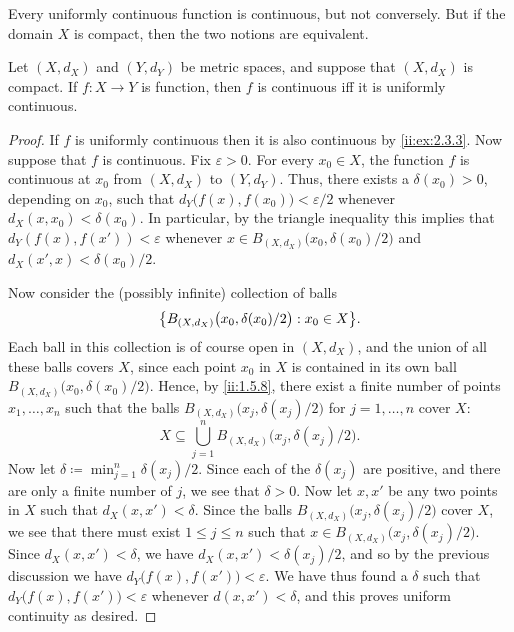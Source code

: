 \begin{note}
  Every uniformly continuous function is continuous, but not conversely.
  But if the domain \(X\) is compact, then the two notions are equivalent.
\end{note}

\begin{thm}\label{ii:2.3.5}
  Let \((X, d_X)\) and \((Y, d_Y)\) be metric spaces, and suppose that \((X, d_X)\) is compact.
  If \(f : X \to Y\) is function, then \(f\) is continuous iff it is uniformly continuous.
\end{thm}

\begin{proof}
  If \(f\) is uniformly continuous then it is also continuous by \cref{ii:ex:2.3.3}.
  Now suppose that \(f\) is continuous.
  Fix \(\varepsilon > 0\).
  For every \(x_0 \in X\), the function \(f\) is continuous at \(x_0\) from \((X, d_X)\) to \((Y, d_Y)\).
  Thus, there exists a \(\delta(x_0) > 0\), depending on \(x_0\), such that \(d_Y\big(f(x), f(x_0)\big) < \varepsilon / 2\) whenever \(d_X(x, x_0) < \delta(x_0)\).
  In particular, by the triangle inequality this implies that \(d_Y(f(x), f(x')) < \varepsilon\) whenever \(x \in B_{(X, d_X)}\big(x_0, \delta(x_0) / 2\big)\) and \(d_X(x', x) < \delta(x_0) / 2\).

  Now consider the (possibly infinite) collection of balls
  \[
    \set{B_{(X, d_X)}\big(x_0, \delta(x_0) / 2\big) : x_0 \in X}.
  \]
  Each ball in this collection is of course open in \((X, d_X)\), and the union of all these balls covers \(X\), since each point \(x_0\) in \(X\) is contained in its own ball \(B_{(X, d_X)}\big(x_0, \delta(x_0) / 2\big)\).
  Hence, by \cref{ii:1.5.8}, there exist a finite number of points \(x_1, \dots, x_n\) such that the balls \(B_{(X, d_X)}\big(x_j, \delta(x_j) / 2\big)\) for \(j = 1, \dots, n\) cover \(X\):
  \[
    X \subseteq \bigcup_{j = 1}^n B_{(X, d_X)}\big(x_j, \delta(x_j) / 2\big).
  \]
  Now let \(\delta \coloneqq \min_{j = 1}^n \delta(x_j) / 2\).
  Since each of the \(\delta(x_j)\) are positive, and there are only a finite number of \(j\), we see that \(\delta > 0\).
  Now let \(x, x'\) be any two points in \(X\) such that \(d_X(x, x') < \delta\).
  Since the balls \(B_{(X, d_X)}\big(x_j, \delta(x_j) / 2\big)\) cover \(X\), we see that there must exist \(1 \leq j \leq n\) such that \(x \in B_{(X, d_X)}\big(x_j, \delta(x_j) / 2\big)\).
  Since \(d_X(x, x') < \delta\), we have \(d_X(x, x') < \delta(x_j) / 2\), and so by the previous discussion we have \(d_Y\big(f(x), f(x')\big) < \varepsilon\).
  We have thus found a \(\delta\) such that \(d_Y\big(f(x), f(x')\big) < \varepsilon\) whenever \(d(x, x') < \delta\), and this proves uniform continuity as desired.
\end{proof}

